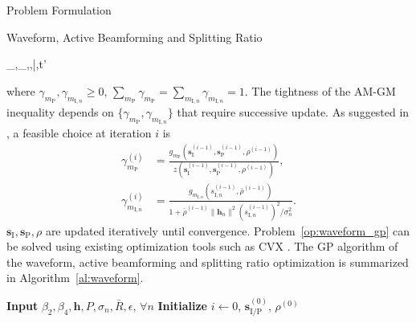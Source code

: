 \documentclass[journal]{IEEEtran}
\begin{document}
\begin{section}{Problem Formulation}
\begin{subsection}{Waveform, Active Beamforming and Splitting Ratio}
			\begin{mini!}
				{_{},_,\rho,\bar{\rho},t'}{}{\label{op:waveform_gp}}{}
			\end{mini!}
			where $\gamma_{m_\mathrm{P}},\gamma_{m_{\mathrm{I},n}} \ge 0$, $\sum_{m_\mathrm{P}}\gamma_{m_\mathrm{P}}=\sum_{m_{\mathrm{I},n}}\gamma_{m_{\mathrm{I},n}}=1$. The tightness of the AM-GM inequality depends on $\{\gamma_{m_\mathrm{P}},\gamma_{m_{\mathrm{I},n}}\}$ that require successive update. As suggested in \cite{Clerckx2018b}, a feasible choice at iteration $i$ is
			\begin{align}
				\gamma_{m_\mathrm{P}}^{(i)} & = \frac{g_{m_\mathrm{P}}(\boldsymbol{s}_{\mathrm{I}}^{(i-1)},\boldsymbol{s}_\mathrm{P}^{(i-1)},\rho^{(i-1)})}{z(\boldsymbol{s}_{\mathrm{I}}^{(i-1)},\boldsymbol{s}_\mathrm{P}^{(i-1)},\rho^{(i-1)})}\label{eq:gamma_P},\\
				\gamma_{m_{\mathrm{I},n}}^{(i)} & = \frac{g_{m_{\mathrm{I},n}}(s_{\mathrm{I},n}^{(i-1)},\bar{\rho}^{(i-1)})}{1+{\bar{\rho}^{(i-1)}\lVert{\boldsymbol{h}_n}\rVert^2 (s_{\mathrm{I},n}^{(i-1)})^2}\big/{\sigma_n^2}}.\label{eq:gamma_I}
			\end{align}
			$\boldsymbol{s}_{\mathrm{I}},\boldsymbol{s}_\mathrm{P},\rho$ are updated iteratively until convergence. Problem~\eqref{op:waveform_gp} can be solved using existing optimization tools such as CVX \cite{Grant2013}. The GP algorithm of the waveform, active beamforming and splitting ratio optimization is summarized in Algorithm~\ref{al:waveform}.
			\begin{algorithm}[!t]
				\caption{GP: Waveform, Active Beamforming and Splitting Ratio.}
				\label{al:waveform}
				\begin{algorithmic}[1]
					\State \textbf{Input} $\beta_2,\beta_4,\boldsymbol{h},P,\sigma_n,\bar{R},\epsilon$, $\forall n$
					\State \textbf{Initialize} $i \gets 0$, $\boldsymbol{s}_{\mathrm{I/P}}^{(0)}$, $\rho^{(0)}$
					\Repeat

\end{algorithmic}
\end{algorithm}
\end{subsection}
\end{section}
\end{document}
